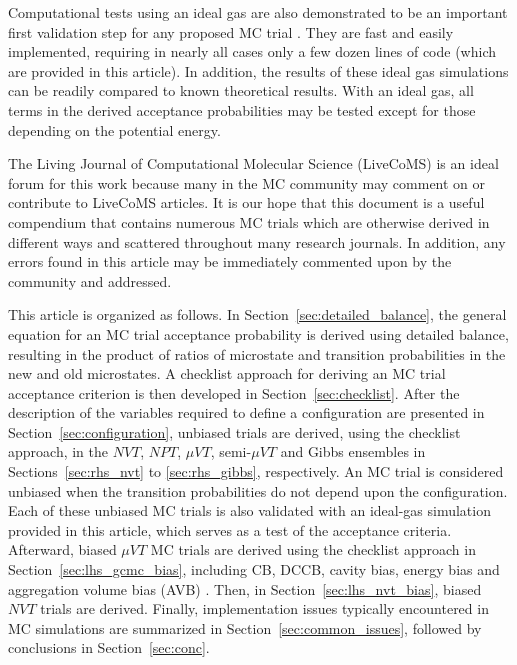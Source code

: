 Computational tests using an ideal gas are also demonstrated to be an important first validation step for any proposed MC trial \cite{hatch_theory_2024}.
They are fast and easily implemented, requiring in nearly all cases only a few dozen lines of code (which are provided in this article).
In addition, the results of these ideal gas simulations can be readily compared to known theoretical results.
With an ideal gas, all terms in the derived acceptance probabilities may be tested except for those depending on the potential energy.

The Living Journal of Computational Molecular Science (LiveCoMS) is an ideal forum for this work because many in the MC community may comment on or contribute to LiveCoMS articles.
It is our hope that this document is a useful compendium that contains numerous MC trials which are otherwise derived in different ways and scattered throughout many research journals.
In addition, any errors found in this article may be immediately commented upon by the community and addressed.

This article is organized as follows.
In Section~\ref{sec:detailed_balance}, the general equation for an MC trial acceptance probability is derived using detailed balance, resulting in the product of ratios of microstate and transition probabilities in the new and old microstates.
A checklist approach for deriving an MC trial acceptance criterion is then developed in Section~\ref{sec:checklist}.
After the description of the variables required to define a configuration are presented in Section~\ref{sec:configuration}, unbiased trials are derived, using the checklist approach, in the $NVT$, $NPT$, $\mu VT$, semi-$\mu VT$ and Gibbs ensembles in Sections~\ref{sec:rhs_nvt} to \ref{sec:rhs_gibbs}, respectively.
An MC trial is considered unbiased when the transition probabilities do not depend upon the configuration.
Each of these unbiased MC trials is also validated with an ideal-gas simulation provided in this article, which serves as a test of the acceptance criteria.
Afterward, biased $\mu VT$ MC trials are derived using the checklist approach in Section~\ref{sec:lhs_gcmc_bias}, including CB, DCCB, cavity bias, energy bias and aggregation volume bias (AVB) \cite{chen_aggregation-volume-bias_2001}.
Then, in Section~\ref{sec:lhs_nvt_bias}, biased $NVT$ trials are derived.
Finally, implementation issues typically encountered in MC simulations are summarized in Section~\ref{sec:common_issues}, followed by conclusions in Section~\ref{sec:conc}.


